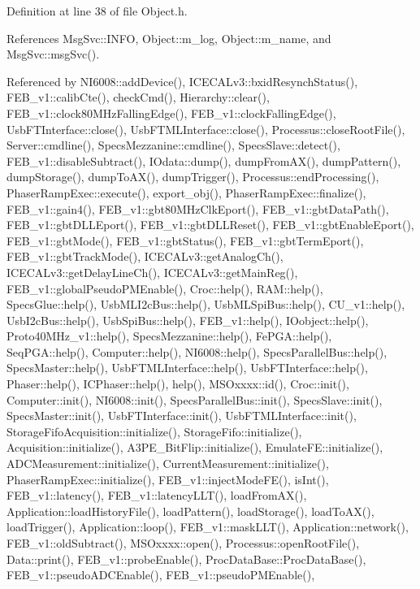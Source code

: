 Definition at line 38 of file Object.\+h.



References Msg\+Svc\+::\+I\+N\+FO, Object\+::m\+\_\+log, Object\+::m\+\_\+name, and Msg\+Svc\+::msg\+Svc().



Referenced by N\+I6008\+::add\+Device(), I\+C\+E\+C\+A\+Lv3\+::bxid\+Resynch\+Status(), F\+E\+B\+\_\+v1\+::calib\+Cte(), check\+Cmd(), Hierarchy\+::clear(), F\+E\+B\+\_\+v1\+::clock80\+M\+Hz\+Falling\+Edge(), F\+E\+B\+\_\+v1\+::clock\+Falling\+Edge(), Usb\+F\+T\+Interface\+::close(), Usb\+F\+T\+M\+L\+Interface\+::close(), Processus\+::close\+Root\+File(), Server\+::cmdline(), Specs\+Mezzanine\+::cmdline(), Specs\+Slave\+::detect(), F\+E\+B\+\_\+v1\+::disable\+Subtract(), I\+Odata\+::dump(), dump\+From\+A\+X(), dump\+Pattern(), dump\+Storage(), dump\+To\+A\+X(), dump\+Trigger(), Processus\+::end\+Processing(), Phaser\+Ramp\+Exec\+::execute(), export\+\_\+obj(), Phaser\+Ramp\+Exec\+::finalize(), F\+E\+B\+\_\+v1\+::gain4(), F\+E\+B\+\_\+v1\+::gbt80\+M\+Hz\+Clk\+Eport(), F\+E\+B\+\_\+v1\+::gbt\+Data\+Path(), F\+E\+B\+\_\+v1\+::gbt\+D\+L\+L\+Eport(), F\+E\+B\+\_\+v1\+::gbt\+D\+L\+L\+Reset(), F\+E\+B\+\_\+v1\+::gbt\+Enable\+Eport(), F\+E\+B\+\_\+v1\+::gbt\+Mode(), F\+E\+B\+\_\+v1\+::gbt\+Status(), F\+E\+B\+\_\+v1\+::gbt\+Term\+Eport(), F\+E\+B\+\_\+v1\+::gbt\+Track\+Mode(), I\+C\+E\+C\+A\+Lv3\+::get\+Analog\+Ch(), I\+C\+E\+C\+A\+Lv3\+::get\+Delay\+Line\+Ch(), I\+C\+E\+C\+A\+Lv3\+::get\+Main\+Reg(), F\+E\+B\+\_\+v1\+::global\+Pseudo\+P\+M\+Enable(), Croc\+::help(), R\+A\+M\+::help(), Specs\+Glue\+::help(), Usb\+M\+L\+I2c\+Bus\+::help(), Usb\+M\+L\+Spi\+Bus\+::help(), C\+U\+\_\+v1\+::help(), Usb\+I2c\+Bus\+::help(), Usb\+Spi\+Bus\+::help(), F\+E\+B\+\_\+v1\+::help(), I\+Oobject\+::help(), Proto40\+M\+Hz\+\_\+v1\+::help(), Specs\+Mezzanine\+::help(), Fe\+P\+G\+A\+::help(), Seq\+P\+G\+A\+::help(), Computer\+::help(), N\+I6008\+::help(), Specs\+Parallel\+Bus\+::help(), Specs\+Master\+::help(), Usb\+F\+T\+M\+L\+Interface\+::help(), Usb\+F\+T\+Interface\+::help(), Phaser\+::help(), I\+C\+Phaser\+::help(), help(), M\+S\+Oxxxx\+::id(), Croc\+::init(), Computer\+::init(), N\+I6008\+::init(), Specs\+Parallel\+Bus\+::init(), Specs\+Slave\+::init(), Specs\+Master\+::init(), Usb\+F\+T\+Interface\+::init(), Usb\+F\+T\+M\+L\+Interface\+::init(), Storage\+Fifo\+Acquisition\+::initialize(), Storage\+Fifo\+::initialize(), Acquisition\+::initialize(), A3\+P\+E\+\_\+\+Bit\+Flip\+::initialize(), Emulate\+F\+E\+::initialize(), A\+D\+C\+Measurement\+::initialize(), Current\+Measurement\+::initialize(), Phaser\+Ramp\+Exec\+::initialize(), F\+E\+B\+\_\+v1\+::inject\+Mode\+F\+E(), is\+Int(), F\+E\+B\+\_\+v1\+::latency(), F\+E\+B\+\_\+v1\+::latency\+L\+L\+T(), load\+From\+A\+X(), Application\+::load\+History\+File(), load\+Pattern(), load\+Storage(), load\+To\+A\+X(), load\+Trigger(), Application\+::loop(), F\+E\+B\+\_\+v1\+::mask\+L\+L\+T(), Application\+::network(), F\+E\+B\+\_\+v1\+::old\+Subtract(), M\+S\+Oxxxx\+::open(), Processus\+::open\+Root\+File(), Data\+::print(), F\+E\+B\+\_\+v1\+::probe\+Enable(), Proc\+Data\+Base\+::\+Proc\+Data\+Base(), F\+E\+B\+\_\+v1\+::pseudo\+A\+D\+C\+Enable(), F\+E\+B\+\_\+v1\+::pseudo\+P\+M\+Enable(), 